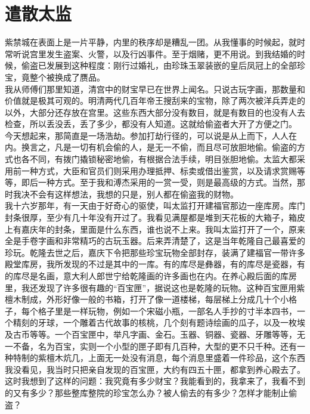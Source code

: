 \fancyhead[RO]{} %
\fancyhead[LE]{} %
\chapter*{遣散太监}
\thispagestyle{empty}
紫禁城在表面上是一片平静，内里的秩序却是糟乱一团。从我懂事的时候起，就时常听说宫里发生盗案、火警，以及行凶事件。至于烟赌，更不用说。到我结婚的时候，偷盗已发展到这种程度：刚行过婚礼，由珍珠玉翠装嵌的皇后凤冠上的全部珍宝，竟整个被换成了赝品。\\

我从师傅们那里知道，清宫中的财宝早已在世界上闻名。只说古玩字画，那数量和价值就是极其可观的。明清两代几百年帝王搜刮来的宝物，除了两次被洋兵弄走的以外，大部分还存放在宫里。这些东西大部分没有数目，就是有数目的也没有人去检查，所以丢没丢，丢了多少，都没有人知道。这就给偷盗者大开了方便之门。\\

今天想起来，那简直是一场浩劫。参加打劫行径的，可以说是从上而下，人人在内。换言之，凡是一切有机会偷的人，是无一不偷，而且尽可放胆地偷。偷盗的方式也各不同，有拨门撬锁秘密地偷，有根据合法手续，明目张胆地偷。太监大都采用前一种方式，大臣和官员们则采用办理抵押、标卖或借出鉴赏，以及请求赏赐等等，即后一种方式。至于我和溥杰采用的一赏一受，则是最高级的方式。当然，那时我决不会有这样想法，我想的只是，别人都在偷盗我的财物。\\

我十六岁那年，有一天由于好奇心的驱使，叫太监打开建福官那边一座库房。库门封条很厚，至少有几十年没有开过了。我看见满屋都是堆到天花板的大箱子，箱皮上有嘉庆年的封条，里面是什么东西，谁也说不上来。我叫太监打开了一个，原来全是手卷字画和非常精巧的古玩玉器。后来弄清楚了，这是当年乾隆自己最喜爱的珍玩。乾隆去世之后，嘉庆下令把那些珍宝玩物全部封存，装满了建福官一带许多殿堂库房，我所发现的不过是其中的一库。有的库尽是彝器，有的库尽是瓷器，有的库尽是名画，意大利人郎世宁给乾隆画的许多画也在内。在养心殿后面的库房里，我还发现了许多很有趣的“百宝匣”，据说这也是乾隆的玩物。这种百宝匣用紫檀木制成，外形好像一般的书箱，打开了像一道楼梯，每层梯上分成几十个小格子，每个格子里是一样玩物，例如一个宋磁小瓶，一部名人手抄的寸半本四书，一个精刻的牙球，一个雕着古代故事的核桃，几个刻有题诗绘画的瓜子，以及一枚埃及古币等等。一个百宝匣中，举凡字画、金石。玉器、铜器、瓷器、牙雕等等，无一不备，名为百宝，实则一个小型的匣子即有几百种，大型的更不只千种。还有一种特制的紫檀木炕几，上面无一处没有消息，每个消息里盛着一件珍品，这个东西我没看见，我当时只把亲自发现的百宝匣，大约有四五十匣，都拿到养心殿去了。这时我想到了这样的问题：我究竟有多少财宝？我能看到的，我拿来了，我看不到的又有多少？那些整库整院的珍宝怎么办？被人偷去的有多少？怎样才能制止偷盗？\\

